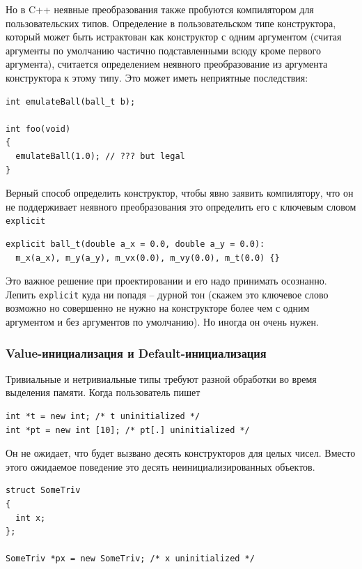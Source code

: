 \documentclass[a4paper,12pt,oneside]{article}
\begin{document}
Но в C++ неявные преобразования также пробуются компилятором для пользовательских типов. Определение в пользовательском типе конструктора, который может быть истрактован как конструктор с одним аргументом (считая аргументы по умолчанию частично подставленными всюду кроме первого аргумента), считается определением неявного преобразование из аргумента конструктора к этому типу. Это может иметь неприятные последствия:

\begin{lstlisting}
int emulateBall(ball_t b);

int foo(void)
{
  emulateBall(1.0); // ??? but legal
}
\end{lstlisting}

Верный способ определить конструктор, чтобы явно заявить компилятору, что он не поддерживает неявного преобразования это определить его с ключевым словом \lstinline!explicit!

\begin{lstlisting}
explicit ball_t(double a_x = 0.0, double a_y = 0.0):
  m_x(a_x), m_y(a_y), m_vx(0.0), m_vy(0.0), m_t(0.0) {}
\end{lstlisting}

Это важное решение при проектировании и его надо принимать осознанно. Лепить \lstinline!explicit! куда ни попадя -- дурной тон (скажем это ключевое слово возможно но совершенно не нужно на конструкторе более чем с одним аргументом и без аргументов по умолчанию). Но иногда он очень нужен.

\subsubsection{Value-инициализация и Default-инициализация}\label{ValDefInit}

Тривиальные и нетривиальные типы требуют разной обработки во время выделения памяти. Когда пользователь пишет

\begin{lstlisting}
int *t = new int; /* t uninitialized */
int *pt = new int [10]; /* pt[.] uninitialized */
\end{lstlisting}

Он не ожидает, что будет вызвано десять конструкторов для целых чисел. Вместо этого ожидаемое поведение это десять неинициализированных объектов.

\begin{lstlisting}
struct SomeTriv
{
  int x;
};

SomeTriv *px = new SomeTriv; /* x uninitialized */
\end{lstlisting}
\end{document}
